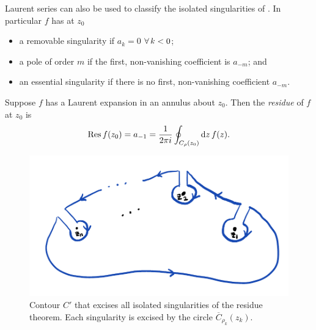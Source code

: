Laurent series can also be used to classify the isolated singularities
of . In particular $f$ has at $z_0$
\begin{itemize}
  \item a removable singularity if $a_k=0$ $\operatorname{\forall} k<0$;
  \item a pole of order $m$ if the first, non-vanishing coefficient
        is $a_{-m}$; and
  \item an essential singularity if there is no first, non-vanishing
        coefficient $a_{-m}$.
\end{itemize}

Suppose $f$ has a Laurent expansion in an annulus about $z_0$.
Then the {\it residue} of $f$ at $z_0$ is
\begin{equation}
 \Res f(z_0)=a_{-1}=\frac{1}{2\pi i}\oint_{C_{\rho}(z_0)}\dd{z}f(z).
\end{equation}

\begin{figure}
\includegraphics[width=\linewidth]{figs/residue_theorem-cropped.pdf}
\caption{Contour $C'$ that excises all isolated singularities of
the residue theorem. Each singularity is excised by the circle
$\overline{C}_{\rho_k}(z_k)$.}
\label{fig:residue}
\end{figure}

